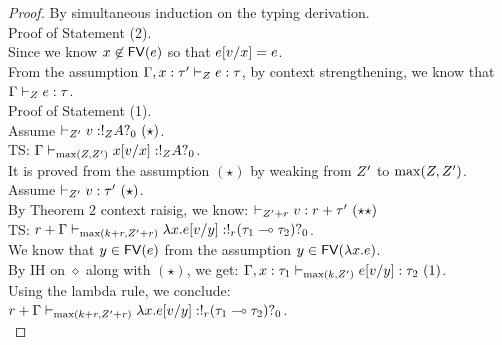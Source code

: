 \begin{proof}
  By simultaneous induction on the typing derivation.\\
  Proof of Statement (2).\\
  Since we know $x \not \in \mathsf{FV} (e)$ so that $e[v/x]  =
  e$. \\
  From the assumption $ \Gamma,x : \tau' \vdash_{ Z} e :
  \tau $, by context strengthening,  we know that $   \Gamma  \vdash_{
    Z} e : \tau $.\\

  Proof of Statement (1).\\
  
  Assume  $\empty \tvdash{\nnatA'} \valr : \bang{\nnatA} \ltype \whynot{0}  ~(\star) $.\\
  TS:   $\Gamma \vdash_{\max(Z, Z')} x [v/x]  :
  !_{Z} A ?_{0} $.\\
  It is proved from the assumption $(\star)$ by weaking from $Z'$
  to $\max(Z,Z')$.\\

 

  Assume  $\empty \tvdash{\nnatA'} \valr : \type' ~(\star) $.\\
  By Theorem 2 context raisig, we know: $\empty \tvdash{\nnatA'+r} \valr : r+\type' ~(\star\star) $\\
  TS:   $r+\Gamma \vdash_{\max(k+r, Z'+r)} \lambda x. e [v/y]  :
  !_{r}  ( \tau_1 \multimap \tau_2)?_{0}$.\\
  We know that $y \in \mathsf{FV} (e)$ from the assumption $ y \in \mathsf{FV} (\lambda x.e) $.\\
  By IH on $\diamond$ along with $(\star)$, we get:  $\Gamma,x:\tau_1 \vdash_{\max(k, Z')}  e [v/y]  :
  \tau_2 ~(1)$.\\
  Using the lambda rule, we conclude: \\
  $r+\Gamma \vdash_{\max(k+r, Z'+r)} \lambda x. e [v/y]  :
  !_{r}  ( \tau_1 \multimap \tau_2)?_{0} $.\\


\end{proof}
